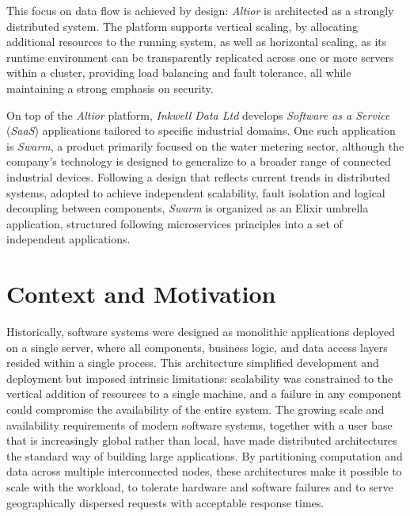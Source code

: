 This focus on data flow is achieved by design: \textit{Altior} is architected
as a strongly distributed system. The platform supports vertical scaling, by
allocating additional resources to the running system, as well as horizontal
scaling, as its runtime environment can be transparently replicated across
one or more servers within a cluster, providing load balancing and fault
tolerance, all while maintaining a strong emphasis on security. 

On top of the \textit{Altior} platform, \textit{Inkwell Data Ltd} develops
\textit{Software as a Service} (\textit{SaaS}) applications tailored to specific
industrial domains. One such application is \textit{Swarm}, a product primarily
focused on the water metering sector, although the company's technology is
designed to generalize to a broader range of connected industrial devices.
Following a design that reflects current trends in distributed systems,
adopted to achieve independent scalability, fault isolation and logical
decoupling between components, \textit{Swarm} is organized as an Elixir umbrella
application, structured following microservices principles into a set of
independent applications.


\section{Context and Motivation}
Historically, software systems were designed as monolithic applications
deployed on a single server, where all components, business logic, and data
access layers resided within a single process. This architecture simplified
development and deployment but imposed intrinsic limitations: scalability was
constrained to the vertical addition of resources to a single machine, and a
failure in any component could compromise the availability of the entire
system. The growing scale and availability requirements of modern software
systems, together with a user base that is increasingly global rather than
local, have made distributed architectures the standard way of building large
applications. By partitioning computation and data across multiple
interconnected nodes, these architectures make it possible to scale with the
workload, to tolerate hardware and software failures and to serve geographically
dispersed requests with acceptable response times.

